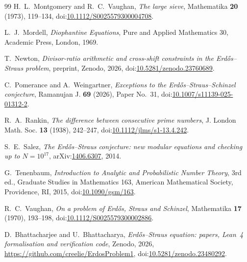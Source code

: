 \documentclass[aps,prd,twocolumn,superscriptaddress,nofootinbib,longbibliography,floatfix,showkeys,nobalancelastpage,amsmath,amssymb,10pt]{revtex4-2}
\theoremstyle{plain}
\theoremstyle{definition}
\theoremstyle{plain}
\newcommand{\repoURL}{https://github.com/creelie/ErdosProblem1}
\begin{document}
\begin{thebibliography}{99}
H.~L.~Montgomery and R.~C.~Vaughan, \emph{The large sieve}, Mathematika \textbf{20} (1973), 119--134, doi:\href{https://doi.org/10.1112/S0025579300004708}{10.1112/S0025579300004708}.

L.~J.~Mordell, \emph{Diophantine Equations}, Pure and Applied Mathematics 30, Academic Press, London, 1969.

T.~Newton, \emph{Divisor-ratio arithmetic and cross-shift constraints in the Erd\H{o}s--Straus problem}, preprint, Zenodo, 2026, doi:\href{https://doi.org/10.5281/zenodo.23760689}{10.5281/zenodo.23760689}.

C.~Pomerance and A.~Weingartner, \emph{Exceptions to the Erd\H{o}s--Straus--Schinzel conjecture}, Ramanujan J. \textbf{69} (2026), Paper No.~31, doi:\href{https://doi.org/10.1007/s11139-025-01312-2}{10.1007/s11139-025-01312-2}.

R.~A.~Rankin, \emph{The difference between consecutive prime numbers}, J. London Math. Soc. \textbf{13} (1938), 242--247, doi:\href{https://doi.org/10.1112/jlms/s1-13.4.242}{10.1112/jlms/s1-13.4.242}.

S.~E.~Salez, \emph{The Erd\H{o}s--Straus conjecture: new modular equations and checking up to $N=10^{17}$}, arXiv:\href{https://arxiv.org/abs/1406.6307}{1406.6307}, 2014.

G.~Tenenbaum, \emph{Introduction to Analytic and Probabilistic Number Theory}, 3rd ed., Graduate Studies in Mathematics 163, American Mathematical Society, Providence, RI, 2015, doi:\href{https://doi.org/10.1090/gsm/163}{10.1090/gsm/163}.

R.~C.~Vaughan, \emph{On a problem of Erd\H{o}s, Straus and Schinzel}, Mathematika \textbf{17} (1970), 193--198, doi:\href{https://doi.org/10.1112/S0025579300002886}{10.1112/S0025579300002886}.

D.~Bhattacharjee and U.~Bhattacharya, \emph{Erd\H{o}s--Straus equation: papers, Lean~4 formalisation and verification code}, Zenodo, 2026, \url{\repoURL}, doi:\href{https://doi.org/10.5281/zenodo.23480292}{10.5281/zenodo.23480292}.

\end{thebibliography}
\endgroup
\end{document}

